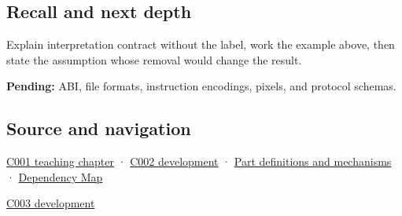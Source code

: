 \subsection{Recall and next depth}\label{appendix-f414bd4ed05c-recall-and-next-depth}

Explain interpretation contract without the label, work the example above, then state the assumption whose removal would change the result.

\textbf{Pending:} ABI, file formats, instruction encodings, pixels, and protocol schemas.

\subsection{Source and navigation}\label{appendix-f414bd4ed05c-source-and-navigation}

\hyperref[01-foundations-i-ch001-from-a-signal-to-an-interpretation]{C001 teaching chapter} · \hyperref[01-foundations-i-ch001-arithmetic-becomes-a-policy]{C002 development} · \hyperref[appendix-fd090d982a15]{Part definitions and mechanisms} · \hyperref[appendix-4ad47bdd269a]{Dependency Map}

\hyperref[01-foundations-i-ch002-where-the-bytes-live]{C003 development}
